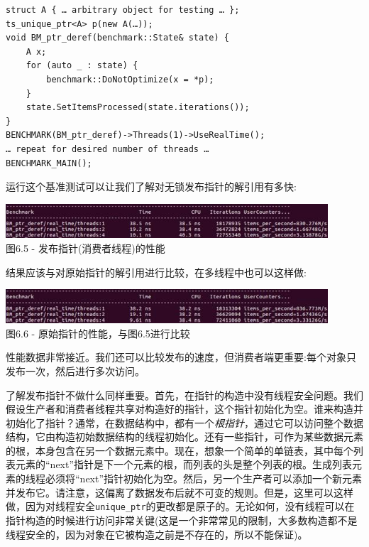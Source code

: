 \begin{lstlisting}[style=styleCXX]
struct A { … arbitrary object for testing … };
ts_unique_ptr<A> p(new A(…));
void BM_ptr_deref(benchmark::State& state) {
	A x;
	for (auto _ : state) {
		benchmark::DoNotOptimize(x = *p);
	}
	state.SetItemsProcessed(state.iterations());
}
BENCHMARK(BM_ptr_deref)->Threads(1)->UseRealTime();
… repeat for desired number of threads …
BENCHMARK_MAIN();
\end{lstlisting}

运行这个基准测试可以让我们了解对无锁发布指针的解引用有多快:

\begin{center}
\includegraphics[width=0.9\textwidth]{content/2/chapter6/images/5.jpg}\\
图6.5 - 发布指针(消费者线程)的性能
\end{center}

结果应该与对原始指针的解引用进行比较，在多线程中也可以这样做:

\begin{center}
\includegraphics[width=0.9\textwidth]{content/2/chapter6/images/6.jpg}\\
图6.6 - 原始指针的性能，与图6.5进行比较
\end{center}

性能数据非常接近。我们还可以比较发布的速度，但消费者端更重要:每个对象只发布一次，然后进行多次访问。

了解发布指针不做什么同样重要。首先，在指针的构造中没有线程安全问题。我们假设生产者和消费者线程共享对构造好的指针，这个指针初始化为空。谁来构造并初始化了指针？通常，在数据结构中，都有一个\textit{根指针}，通过它可以访问整个数据结构，它由构造初始数据结构的线程初始化。还有一些指针，可作为某些数据元素的根，本身包含在另一个数据元素中。现在，想象一个简单的单链表，其中每个列表元素的“next”指针是下一个元素的根，而列表的头是整个列表的根。生成列表元素的线程必须将“next”指针初始化为空。然后，另一个生产者可以添加一个新元素并发布它。请注意，这偏离了数据发布后就不可变的规则。但是，这里可以这样做，因为对线程安全\texttt{unique\_ptr}的更改都是原子的。无论如何，没有线程可以在指针构造的时候进行访问非常关键(这是一个非常常见的限制，大多数构造都不是线程安全的，因为对象在它被构造之前是不存在的，所以不能保证)。

